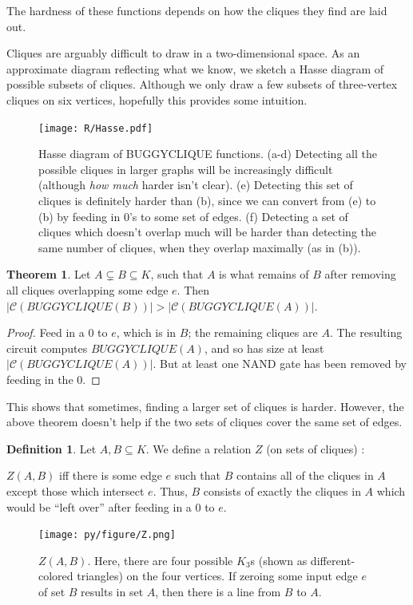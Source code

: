 \documentclass[12pt]{article}
\theoremstyle{definition}
\newtheorem{thm}{Theorem}[section]
\newtheorem{defn}{Definition}[section]
\newcommand{\bigC}[0]{\mathcal{C}}
\begin{document}
The hardness of these functions depends
on how the cliques they find are laid out.

Cliques are arguably difficult to draw in a two-dimensional space.
As an approximate diagram reflecting what we know,
we sketch a Hasse diagram of possible subsets of cliques. Although
we only draw a few subsets of three-vertex cliques
on six vertices, hopefully this provides some
intuition.

\begin{figure}
\centering
\texttt{[image: R/Hasse.pdf]}
\caption{Hasse diagram of BUGGYCLIQUE functions.
(a-d) 
Detecting all the possible cliques in larger graphs will be
increasingly difficult (although {\em how much} harder isn't clear).
(e) 
Detecting this set of cliques is definitely harder than (b),
since we can convert from (e) to (b) by feeding in 0's to
some set of edges.
(f) Detecting a set of cliques which doesn't overlap much will be
harder than detecting the same number of cliques, when they overlap
maximally (as in (b)).}
\label{fig:Hasse}
\end{figure}


\begin{thm}
\label{edgeZonking}
Let $A \subsetneq B \subseteq K$, such that $A$ is what remains
of $B$ after removing all cliques overlapping some edge $e$.
Then $|\bigC(BUGGYCLIQUE(B))| > |\bigC(BUGGYCLIQUE(A))|$.
\end{thm}
\begin{proof}
Feed in a 0 to $e$, which is in $B$; the remaining cliques are $A$.
The resulting
circuit computes $BUGGYCLIQUE(A)$, and so has size
at least $|\bigC(BUGGYCLIQUE(A))|$. But at least one
NAND gate has been removed by feeding in the 0.
\end{proof}

This shows that sometimes, finding a larger set of cliques is
harder. However, the above theorem doesn't help if the two
sets of cliques cover the same set of edges.

\begin{defn}
\label{zRelation}
Let $A, B \subseteq K$. We define a relation $Z$ (on sets of cliques) :

$Z(A,B)$ iff there is some edge $e$ such that $B$ contains all of the
cliques in $A$ except those which intersect $e$. Thus, $B$ consists
of exactly the cliques in $A$ which would be ``left over'' after
feeding in a 0 to $e$.
\end{defn}

\begin{figure}
\centering
\texttt{[image: py/figure/Z.png]}
\caption{$Z(A,B).$ Here, there are four possible $K_3$s
(shown as different-colored triangles) on the four vertices.
If zeroing some input edge $e$ of set $B$ results in set $A$, then
there is a line from $B$ to $A$.
}

\label{fig:Z}
\end{figure}
\end{document}
